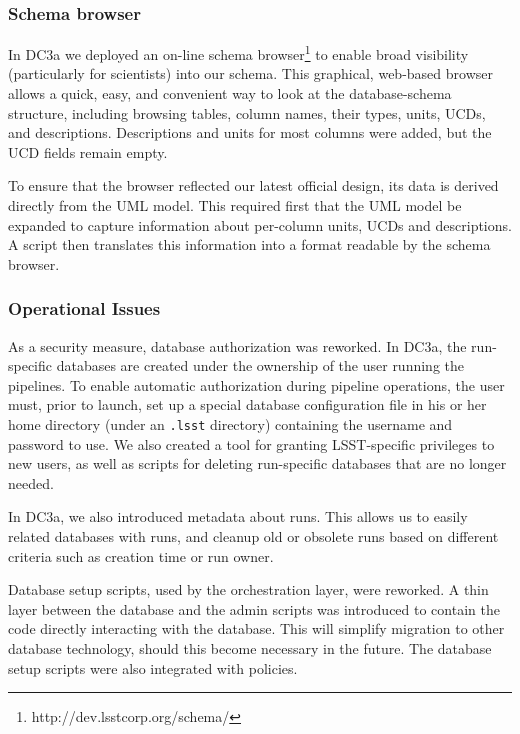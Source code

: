 \subsubsection{Schema browser}

In DC3a we deployed an on-line schema
browser\footnote{http://dev.lsstcorp.org/schema/} to enable broad
visibility (particularly for scientists) into our schema.  This
graphical, web-based browser allows a quick, easy, and convenient way
to look at the database-schema structure, including browsing tables,
column names, their types, units, UCDs, and descriptions.
Descriptions and units for most columns were added, but the UCD fields
remain empty.

To ensure that the browser reflected our latest official design, its
data is derived directly from the UML model.  This required first that
the UML model be expanded to capture information about per-column
units, UCDs and descriptions.  A script then translates this
information into a format readable by the schema browser.  

\subsubsection{Operational Issues}

As a security measure, database authorization was reworked.  In DC3a,
the run-specific databases are created under the ownership of the user
running the pipelines.  To enable automatic authorization during
pipeline operations, the user must, prior to launch, set up a special
database configuration file in his or her home directory (under an
{\tt .lsst} directory) containing the username and password to
use.  We also created a tool for granting LSST-specific privileges to
new users, as well as scripts for deleting run-specific databases that
are no longer needed.

In DC3a, we also introduced metadata about runs. This allows us to
easily related databases with runs, and cleanup old or obsolete runs
based on different criteria such as creation time or run owner.

Database setup scripts, used by the orchestration layer, were
reworked. A thin layer between the database and the admin scripts was
introduced to contain the code directly interacting with the
database. This will simplify migration to other database technology,
should this become necessary in the future.  The database setup scripts
were also integrated with policies.




